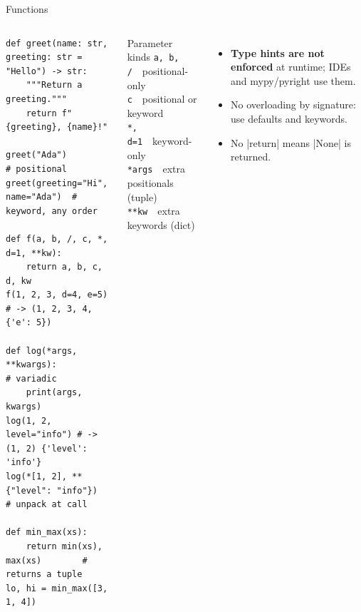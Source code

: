 \documentclass[aspectratio=169,9pt]{beamer}
\newcommand{\cc}[1]{\texttt{#1}}                      %
\begin{document}
\begin{frame}[fragile]{Functions}
\begin{columns}[T]
\begin{lstlisting}
def greet(name: str, greeting: str = "Hello") -> str:
    """Return a greeting."""
    return f"{greeting}, {name}!"

greet("Ada")                      # positional
greet(greeting="Hi", name="Ada")  # keyword, any order

def f(a, b, /, c, *, d=1, **kw):
    return a, b, c, d, kw
f(1, 2, 3, d=4, e=5)    # -> (1, 2, 3, 4, {'e': 5})

def log(*args, **kwargs):          # variadic
    print(args, kwargs)
log(1, 2, level="info") # -> (1, 2) {'level': 'info'}
log(*[1, 2], **{"level": "info"})  # unpack at call

def min_max(xs):
    return min(xs), max(xs)        # returns a tuple
lo, hi = min_max([3, 1, 4])
\end{lstlisting}
\begin{block}{Parameter kinds}
\cc{a, b, /}\ \ positional-only\\
\cc{c}\ \ positional or keyword\\
\cc{*, d=1}\ \ keyword-only\\
\cc{*args}\ \ extra positionals (tuple)\\
\cc{**kw}\ \ extra keywords (dict)
\end{block}
\begin{itemize}\setlength\itemsep{3pt}
  \item \textbf{Type hints are not enforced} at runtime; IDEs and
        mypy/pyright use them.
  \item No overloading by signature: use defaults and keywords.
  \item No |return| means |None| is returned.
\end{itemize}
\end{columns}
\end{frame}
\end{document}
